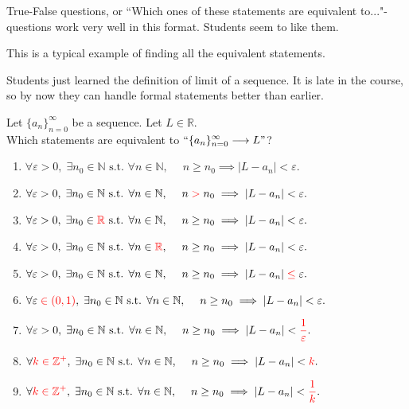 \documentclass[11pt]{article}
\newcommand {\DS} [1] {${\displaystyle #1}$}
\newcommand{\vv}{\vspace{.5cm}}
\newcommand{\R}{\mathbb{R}}
\newcommand{\Z}{\mathbb{Z}}
\newcommand{\N}{\mathbb{N}}
\newcommand{\rojo}[1]{{\color{red} #1}}
\newcommand{\e}{\varepsilon}
\begin{document}
True-False questions, or ``Which ones of these statements are equivalent to..."-questions work very well in this format.  Students seem to like them.

\vv
\begin{example}
This is a typical example of finding all the equivalent statements.
\begin{background}
Students just learned the definition of limit of a sequence.  It is late in the course, so by now they can handle formal statements better than earlier. 
\end{background}

\begin{question}

Let \DS{\{a_n\}_{n=0}^{\infty}} be a sequence.  Let \DS{L \in \R}.  \\
Which statements are equivalent to  \DS{``\{a_n\}_{n=0}^{\infty} \longrightarrow L"}?

\begin{enumerate}
	\item \DS{\forall \e>0, \; \exists n_0 \in \N \mbox{ s.t. } \forall n \in \N, \; \quad n \geq n_0 \implies |L-a_n| < \e.}
	\item \DS{\forall \e>0, \; \exists n_0 \in \N \mbox{ s.t. } \forall n \in \N, \; \quad n \; \rojo{ > } \; n_0 \implies |L-a_n| < \e.}
	\item \DS{\forall \e>0, \; \exists n_0 \in \rojo{\R} \mbox{ s.t. } \forall n \in  \N, \; \quad n \geq n_0 \implies |L-a_n| < \e.}
	\item \DS{\forall \e>0, \; \exists n_0 \in \N \mbox{ s.t. } \forall n \in  \rojo{ \R}, \; \quad n \geq n_0 \implies |L-a_n| < \e.}
	\item \DS{\forall \e>0, \; \exists n_0 \in \N \mbox{ s.t. } \forall n \in \N, \; \quad n \geq n_0 \implies |L-a_n| \; \rojo{\leq} \; \e.}
	\item \DS{\forall \e \; \rojo{\in (0,1)}, \; \exists n_0 \in \N \mbox{ s.t. } \forall n \in \N, \; \quad n \geq n_0 \implies |L-a_n| < \e.}
	\item \DS{\forall \e>0, \; \exists n_0 \in \N \mbox{ s.t. } \forall n \in \N, \; \quad n \geq n_0 \implies |L-a_n| < \rojo{\frac{1}{\e}}.}
	\item \DS{\forall \rojo{k \in \Z^{+} }, \; \exists n_0 \in \N \mbox{ s.t. } \forall n \in \N, \; \quad n \geq n_0 \implies |L-a_n| < \rojo{k}.}
	\item \DS{\forall \rojo{k \in \Z^{+} }, \; \exists n_0 \in \N \mbox{ s.t. } \forall n \in \N, \; \quad n \geq n_0 \implies |L-a_n| < \rojo{\frac{1}{k}}.}
\end{enumerate}



\end{question}
\end{example}
\end{document}
